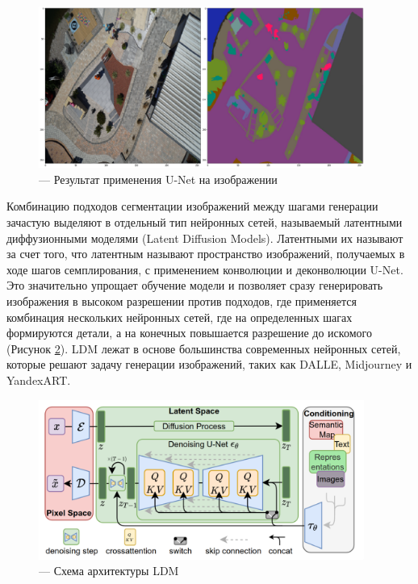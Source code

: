 \begin{figure}[H]
  \centering
  \includegraphics[width=0.95\textwidth]{img/conv.png}
  \caption{--- Результат применения U-Net на изображении}
    \label{fig:conv}
\end{figure}

Комбинацию подходов сегментации изображений между шагами генерации зачастую выделяют в отдельный тип нейронных сетей, называемый
латентными диффузионными моделями (Latent Diffusion Models). Латентными их называют за счет того, что латентным называют пространство
изображений, получаемых в ходе шагов семплирования, с применением конволюции и деконволюции U-Net. Это значительно
упрощает обучение модели и позволяет сразу генерировать изображения в высоком разрешении против подходов, где применяется
комбинация нескольких нейронных сетей, где на определенных шагах формируются детали, а на конечных повышается разрешение
до искомого (Рисунок \ref{fig:latent}).
LDM лежат в основе большинства современных нейронных сетей,
которые решают задачу генерации изображений, таких как DALLE, Midjourney и YandexART.
\begin{figure}[H]
  \centering
  \includegraphics[width=0.95\textwidth]{img/latent.png}
  \caption{--- Схема архитектуры LDM\cite{rombach2022high}}
    \label{fig:latent}
\end{figure}


